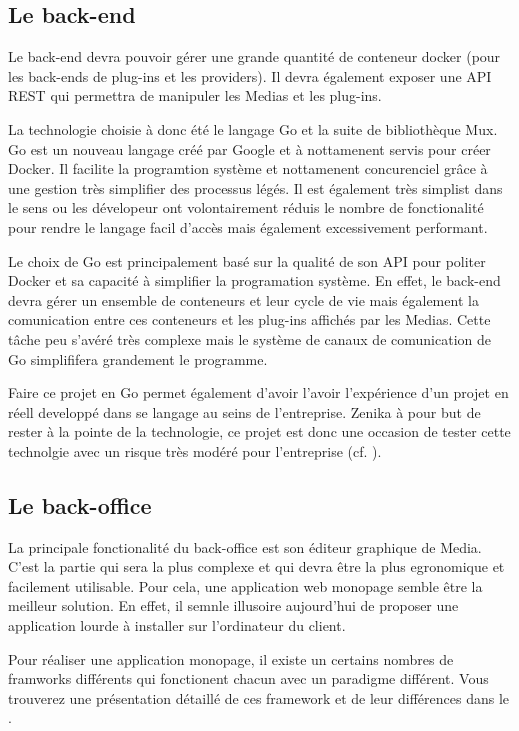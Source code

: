 \subsection{Le back-end}

  Le back-end devra pouvoir gérer une grande quantité de conteneur docker (pour les back-ends de plug-ins et les providers). Il devra également exposer une \gls{API} \gls{REST} qui permettra de manipuler les Medias et les plug-ins.

  La technologie choisie à donc été le langage \gls{Go} et la suite de bibliothèque \gls{Mux}. Go est un nouveau langage créé par Google et à nottamenent servis pour créer \gls{Docker}. Il facilite la programtion système et nottamenent concurenciel grâce à une gestion très simplifier des processus légés. Il est également très simplist dans le sens ou les dévelopeur ont volontairement réduis le nombre de fonctionalité pour rendre le langage facil d'accès mais également excessivement performant.

  Le choix de Go est principalement basé sur la qualité de son \gls{API} pour politer \gls{Docker} et sa capacité à simplifier la programation système. En effet, le back-end devra gérer un ensemble de conteneurs et leur cycle de vie mais également la comunication entre ces conteneurs et les plug-ins affichés par les Medias. Cette tâche peu s'avéré très complexe mais le système de canaux de comunication de Go simplififera grandement le programme.

  Faire ce projet en Go permet également d'avoir l'avoir l'expérience d'un projet en réell developpé dans se langage au seins de l'entreprise. Zenika à pour but de rester à la pointe de la technologie, ce projet est donc une occasion de tester cette technolgie avec un risque très modéré pour l'entreprise (cf. ).

\subsection{Le back-office}

  La principale fonctionalité du back-office est son éditeur graphique de Media. C'est la partie qui sera la plus complexe et qui devra être la plus egronomique et facilement utilisable. Pour cela, une application web monopage semble être la meilleur solution. En effet, il semnle illusoire aujourd'hui de proposer une application lourde à installer sur l'ordinateur du client.

  Pour réaliser une application monopage, il existe un certains nombres de \glspl{framwork} différents qui fonctionent chacun avec un paradigme différent. Vous trouverez une présentation détaillé de ces framework et de leur différences dans le .

